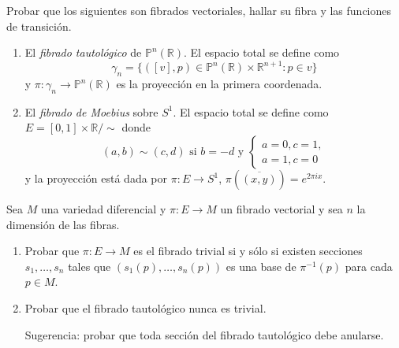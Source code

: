 \documentclass[12pt, a4paper]{amsart}
\theoremstyle{definition}
\newcommand{\RR}{\mathbb{R}}      %
\begin{document}
\begin{question}
Probar que los siguientes son fibrados vectoriales, hallar su fibra y las funciones de transición.
\begin{enumerate}[label=\textbf{\alph*.}]
\item El \textit{fibrado tautológico} de $\mathbb{P}^n(\RR)$. El espacio total se define como $$\gamma_n=\{([v],p)\in\mathbb{P}^n(\RR)\times\RR^{n+1}:p\in v\}$$ y $\pi:\gamma_n\to\mathbb{P}^n(\RR)$ es la proyección en la primera coordenada.
\pagebreak
\item El \textit{fibrado de Moebius} sobre $S^1$. El espacio total se define como $E=[0,1]\times\RR/\sim$ donde $$(a,b)\sim(c,d) \text{ si } b=-d \text{ y }\begin{cases}a=0, c=1,\\ a=1, c=0\end{cases}$$
y la proyección está dada por $\pi:E\to S^1$, $\pi(\overline{(x,y)}) = e^{2\pi i x}$.
\end{enumerate}
\vspace{1em}

\begin{center}
\end{center}
\end{question}

\begin{question}Sea $M$ una variedad diferencial y $\pi:E\to M$ un fibrado vectorial y sea $n$ la dimensión de las fibras.
\begin{enumerate}[label=\textbf{\alph*.}]
\item Probar que $\pi:E\to M$ es el fibrado trivial si y sólo si existen secciones $s_1,\ldots,s_n$ tales que $(s_1(p),\ldots,s_n(p))$ es una base de $\pi^{-1}(p)$ para cada $p\in M$.

\item Probar que el fibrado tautológico nunca es trivial.

\noindent Sugerencia: probar que toda sección del fibrado tautológico debe anularse.
\end{enumerate}
\end{question}
\end{document}
